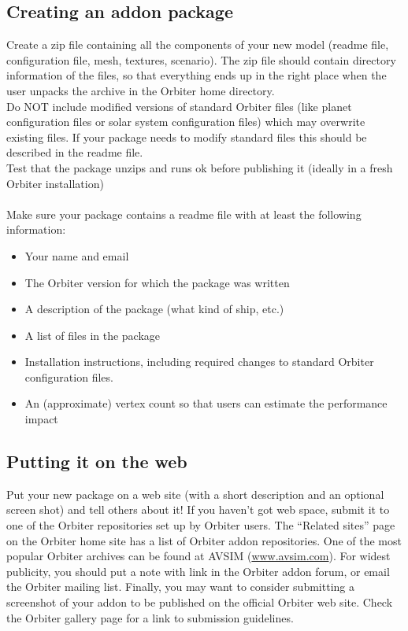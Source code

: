 \documentclass[Orbiter Developer Manual.tex]{subfiles}
\begin{document}
\subsection{Creating an addon package}
Create a zip file containing all the components of your new model (readme file, configuration file, mesh, textures, scenario). The zip file should contain directory information of the files, so that everything ends up in the right place when the user unpacks the archive in the Orbiter home directory.\\
Do NOT include modified versions of standard Orbiter files (like planet configuration files or solar system configuration files) which may overwrite existing files. If your package needs to modify standard files this should be described in the readme file.\\
Test that the package unzips and runs ok before publishing it (ideally in a fresh Orbiter installation)\\
\\
Make sure your package contains a readme file with at least the following information:

\begin{itemize}
\item Your name and email
\item The Orbiter version for which the package was written
\item A description of the package (what kind of ship, etc.)
\item A list of files in the package
\item Installation instructions, including required changes to standard Orbiter configuration files.
\item An (approximate) vertex count so that users can estimate the performance impact
\end{itemize}

\subsection{Putting it on the web}
Put your new package on a web site (with a short description and an optional screen shot) and tell others about it! If you haven’t got web space, submit it to one of the Orbiter repositories set up by Orbiter users. The “Related sites” page on the Orbiter home site has a list of Orbiter addon repositories. One of the most popular Orbiter archives can be found at AVSIM (\url{www.avsim.com}). For widest publicity, you should put a note with link in the Orbiter addon forum, or email the Orbiter mailing list. Finally, you may want to consider submitting a screenshot of your addon to be published on the official Orbiter web site. Check the Orbiter gallery page for a link to submission guidelines.
\end{document}
